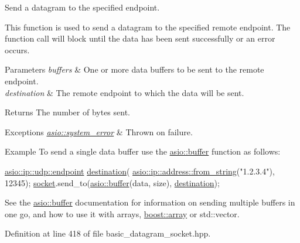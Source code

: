 Send a datagram to the specified endpoint. 

This function is used to send a datagram to the specified remote endpoint. The function call will block until the data has been sent successfully or an error occurs.


\begin{DoxyParams}{Parameters}
{\em buffers} & One or more data buffers to be sent to the remote endpoint.\\
\hline
{\em destination} & The remote endpoint to which the data will be sent.\\
\hline
\end{DoxyParams}
\begin{DoxyReturn}{Returns}
The number of bytes sent.
\end{DoxyReturn}

\begin{DoxyExceptions}{Exceptions}
{\em \hyperlink{classasio_1_1system__error}{asio\+::system\+\_\+error}} & Thrown on failure.\\
\hline
\end{DoxyExceptions}
\begin{DoxyParagraph}{Example}
To send a single data buffer use the \hyperlink{group__buffer}{asio\+::buffer} function as follows\+: 
\begin{DoxyCode}
\hyperlink{classasio_1_1ip_1_1basic__endpoint}{asio::ip::udp::endpoint} \hyperlink{classasio_1_1basic__datagram__socket_a63941967078c45fcc3c315ee150070fb}{destination}(
    \hyperlink{classasio_1_1ip_1_1address_a243a3c877143eff5cdf97a6b021febec}{asio::ip::address::from\_string}(\textcolor{stringliteral}{"1.2.3.4"}), 12345);
\hyperlink{namespacewebsocketpp_1_1transport_1_1asio_1_1socket_1_1error_a828ddaa5ed63a761e1b557465a35f05aa0c31b356014843e1d09514e794a539a7}{socket}.send\_to(\hyperlink{group__buffer_ga1ed66e401559cbfd19595392f653b47c}{asio::buffer}(data, size), \hyperlink{classasio_1_1basic__datagram__socket_a63941967078c45fcc3c315ee150070fb}{destination});
\end{DoxyCode}
 See the \hyperlink{group__buffer}{asio\+::buffer} documentation for information on sending multiple buffers in one go, and how to use it with arrays, \hyperlink{classboost_1_1array}{boost\+::array} or std\+::vector. 
\end{DoxyParagraph}


Definition at line 418 of file basic\+\_\+datagram\+\_\+socket.\+hpp.

\hypertarget{classasio_1_1basic__datagram__socket_a01977a874ce184dbfd6c448db8af9f58}{}
